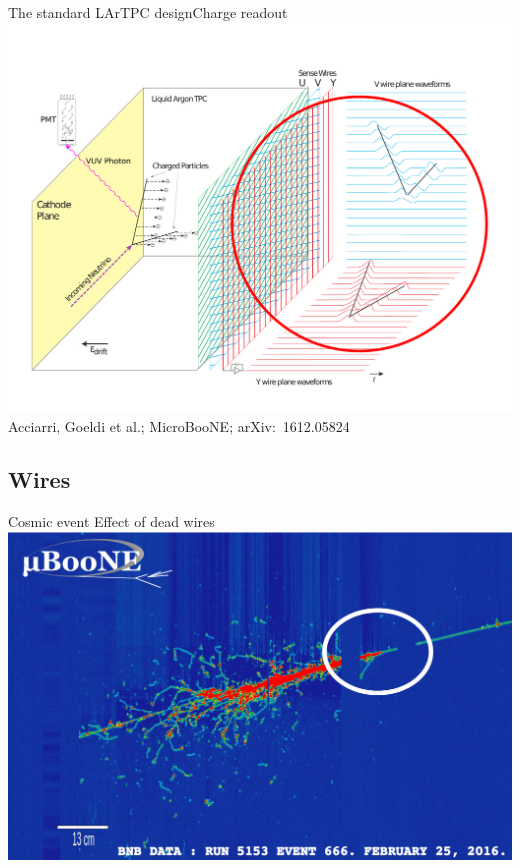 \documentclass[]{beamer}
\newcommand*{\emphcol}{blue}
\newcommand*{\uboone}{{MicroBooNE}}
\newcommand*{\lartpc}{{LArTPC}}
\begin{document}
\begin{frame}{The standard \lartpc{} design}{Charge readout}
	\centering
	\includegraphics[viewport=35 40 755 540, clip, height=.66\textheight]{defence/TPCprinciple_charge-ro}\\
	{\tiny Acciarri, Goeldi et al.; \uboone{}; arXiv:~1612.05824~\cite{uboone}}
\end{frame}

\subsection{Wires}

\begin{frame}{Cosmic event}{\color{\emphcol} Effect of dead wires}
	\centering
	\includegraphics[height=.8\textheight]{defence/uboone_em-shower_dead-wires}
\end{frame}
\end{document}
